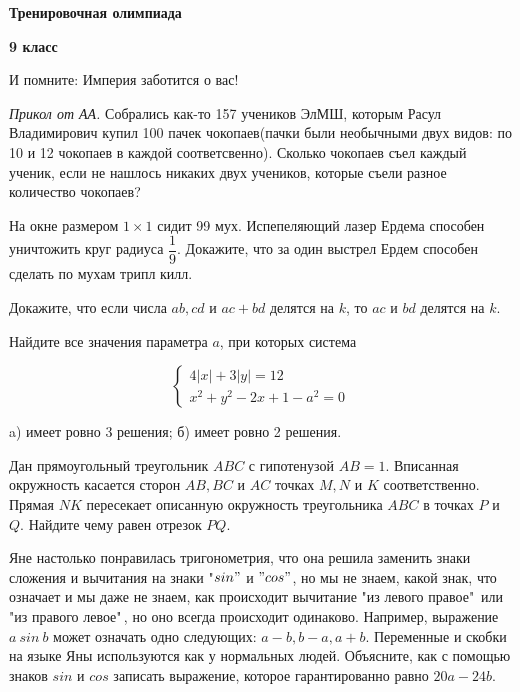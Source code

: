 \centerline{\bf \Huge Тренировочная олимпиада}
\centerline{\bf \Huge 9 класс}

\begin{flushright}
        \scriptsize{И помните: Империя заботится о вас!}
\end{flushright}

\textit{Прикол от АА.}
Собрались как-то 157 учеников ЭлМШ, которым Расул Владимирович купил 100 пачек чокопаев(пачки были необычными двух видов: по 10 и 12 чокопаев в каждой соответсвенно). Сколько чокопаев съел каждый ученик, если не нашлось никаких двух учеников, которые съели разное количество чокопаев?

На окне размером $1 \times 1$ сидит 99 мух. Испепеляющий лазер Ердема способен уничтожить круг радиуса $\dfrac{1}{9}$. Докажите, что за один выстрел Ердем способен сделать по мухам трипл килл.

Докажите, что если числа $ab, cd$ и $ac + bd$ делятся на $k$, то $ac$ и $bd$ делятся на  $k$.

Найдите все значения параметра $a$, при которых система

$$
\left\{\begin{array}{l}
4|x|+3|y|=12 \\
x^2+y^2-2 x+1-a^2=0
\end{array}\right.
$$

a) имеет ровно 3 решения; б) имеет ровно 2 решения.

Дан прямоугольный треугольник $ABC$ с гипотенузой $AB = 1.$ Вписанная окружность касается сторон $AB, BC$ и $AC$ точках $M, N$ и $K$ соответственно. Прямая $NK$ пересекает описанную окружность треугольника $ABC$ в точках $P$ и $Q$. Найдите чему равен отрезок $PQ$.

Яне настолько понравилась тригонометрия, что она решила заменить знаки сложения и вычитания на знаки "$sin"$ и $"cos"$, но мы не знаем, какой знак, что означает и мы даже не знаем, как происходит вычитание "из левого правое"\, или "из правого левое"\,, но оно всегда происходит одинаково. Например, выражение $a \ sin \ b$ может означать одно следующих: $a-b, b-a, a+b$. Переменные и скобки на языке Яны используются как у нормальных людей. Объясните, как с помощью знаков $sin$ и $cos$ записать выражение, которое гарантированно равно $20a - 24b$.